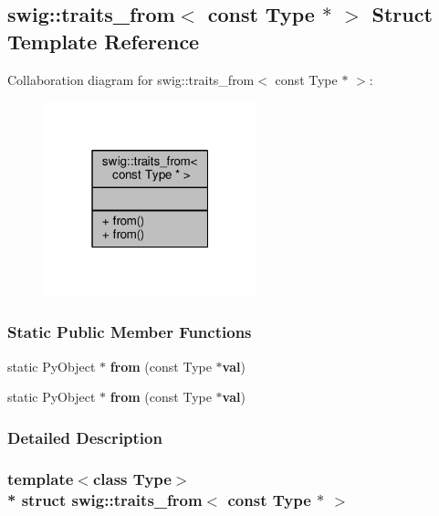 \subsection{swig\+:\+:traits\+\_\+from$<$ const Type $\ast$ $>$ Struct Template Reference}
\label{structswig_1_1traits__from_3_01const_01Type_01_5_01_4}


Collaboration diagram for swig\+:\+:traits\+\_\+from$<$ const Type $\ast$ $>$\+:
\nopagebreak
\begin{figure}[H]
\begin{center}
\leavevmode
\includegraphics[width=175pt]{d4/d2b/structswig_1_1traits__from_3_01const_01Type_01_5_01_4__coll__graph}
\end{center}
\end{figure}
\subsubsection*{Static Public Member Functions}
\begin{DoxyCompactItemize}
\item 
static Py\+Object $\ast$ {\bf from} (const Type $\ast${\bf val})
\item 
static Py\+Object $\ast$ {\bf from} (const Type $\ast${\bf val})
\end{DoxyCompactItemize}


\subsubsection{Detailed Description}
\subsubsection*{template$<$class Type$>$\\*
struct swig\+::traits\+\_\+from$<$ const Type $\ast$ $>$}



